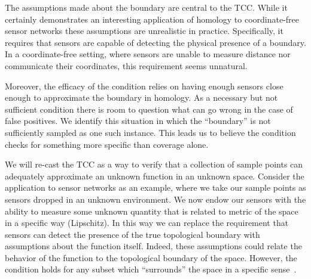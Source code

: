
%

The assumptions made about the boundary are central to the TCC.
While it certainly demonstrates an interesting application of homology to coordinate-free sensor networks these assumptions are unrealistic in practice.
Specifically, it requires that sensors are capable of detecting the physical presence of a boundary.
In a coordinate-free setting, where sensors are unable to measure distance nor communicate their coordinates, this requirement seems unnatural.

Moreover, the efficacy of the condition relies on having enough sensors close enough to approximate the boundary in homology.
As a necessary but not sufficient condition there is room to question what can go wrong in the case of false positives.
We identify this situation in which the ``boundary'' is not sufficiently sampled as one such instance.
This leads us to believe the condition checks for something more specific than coverage alone.

We will re-cast the TCC as a way to verify that a collection of sample points can adequately approximate an unknown function in an unknown space.
Consider the application to sensor networks as an example, where we take our sample points as sensors dropped in an unknown environment.
We now endow our sensors with the ability to measure some unknown quantity that is related to metric of the space in a specific way (Lipschitz).
In this way we can replace the requirement that sensors can detect the presence of the true topological boundary with assumptions about the function itself.
Indeed, these assumptions could relate the behavior of the function to the topological boundary of the space.
However, the condition holds for any subset which ``surrounds'' the space in a specific sense~\cite{cavanna2017when}.

